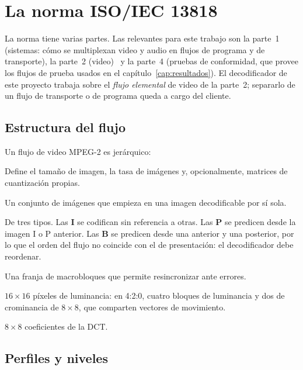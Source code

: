 \section{La norma ISO/IEC 13818}
\label{sec:norma}

La norma tiene varias partes. Las relevantes para este trabajo son la parte~1
(sistemas: cómo se multiplexan video y audio en flujos de programa y de
transporte), la parte~2 (video)~\citep{ISO_13818_2} y la parte~4
(pruebas de conformidad, que provee los flujos de prueba usados en el
capítulo~\ref{cap:resultados}). El decodificador de este proyecto trabaja
sobre el \emph{flujo elemental} de video de la parte~2; separarlo de un flujo
de transporte o de programa queda a cargo del cliente.

\subsection{Estructura del flujo}

Un flujo de video MPEG-2 es jerárquico:

\begin{description}[style=nextline, leftmargin=1.5em]
  \item[Secuencia] Define el tamaño de imagen, la tasa de imágenes y,
    opcionalmente, matrices de cuantización propias.
  \item[Grupo de imágenes (GOP)] Un conjunto de imágenes que empieza en una
    imagen decodificable por sí sola.
  \item[Imagen] De tres tipos. Las \textbf{I} se codifican sin referencia a
    otras. Las \textbf{P} se predicen desde la imagen I o P anterior. Las
    \textbf{B} se predicen desde una anterior y una posterior, por lo que el
    orden del flujo no coincide con el de presentación: el decodificador
    debe reordenar.
  \item[Rebanada (\emph{slice})] Una franja de macrobloques que permite
    resincronizar ante errores.
  \item[Macrobloque] $16 \times 16$ píxeles de luminancia: en 4:2:0, cuatro
    bloques de luminancia y dos de crominancia de $8 \times 8$, que comparten
    vectores de movimiento.
  \item[Bloque] $8 \times 8$ coeficientes de la DCT.
\end{description}

\subsection{Perfiles y niveles}

